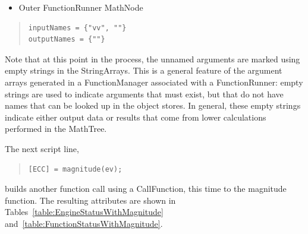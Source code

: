 \begin{itemize}
\item Outer FunctionRunner MathNode
\end{itemize}

\begin{quote}
\begin{verbatim}
inputNames = {"vv", ""}
outputNames = {""}
\end{verbatim}
\end{quote}

\noindent Note that at this point in the process, the unnamed arguments are marked using empty
strings in the StringArrays.  This is a general feature of the argument arrays generated in a
FunctionManager associated with a FunctionRunner: empty strings are used to indicate arguments that
must exist, but that do not have names that can be looked up in the object stores.  In general,
these empty strings indicate either output data or results that come from lower calculations
performed in the MathTree.

The next script line,

\begin{quote}
\begin{verbatim}
[ECC] = magnitude(ev);
\end{verbatim}
\end{quote}

\noindent builds another function call using a CallFunction, this time to the magnitude function. 
The resulting attributes are shown in Tables~\ref{table:EngineStatusWithMagnitude}
and~\ref{table:FunctionStatusWithMagnitude}.

